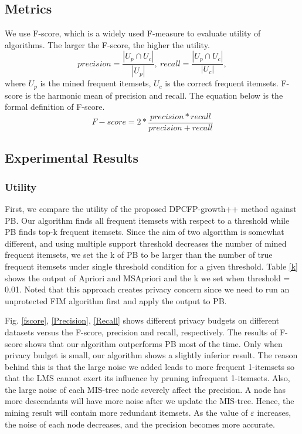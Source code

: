\documentclass[conference]{IEEEtran}
\begin{document}
\subsection{Metrics}
We use F-score, which is a widely used F-measure to evaluate utility of algorithms. 
The larger the F-score, the higher the utility. 
\begin{equation*}
    precision = \frac{|U_p\cap U_c|}{|U_p|}, \ recall = \frac{|U_p\cap U_c|}{|U_c|},
\end{equation*}
where $U_p$ is the mined frequent itemsets, $U_c$ is the correct frequent itemsets. 
F-score is the harmonic mean of precision and recall. 
The equation below is the formal definition of F-score. 
\begin{equation*}    
    F-score = 2*\frac{precision*recall}{precision+recall}
\end{equation*}

\subsection{Experimental Results}
\subsubsection{Utility} 
First, we compare the utility of the proposed DPCFP-growth++ method against PB. 
Our algorithm finds all frequent itemsets with respect to a threshold while PB finds top-k frequent itemsets. 
Since the aim of two algorithm is somewhat different, and using multiple support threshold decreases the number of mined frequent itemsets, 
we set the k of PB to be larger than the number of true frequent itemsets under single threshold condition for a given threshold. 
Table \ref{k} shows the output of Apriori and MSApriori and the k we set when threshold = 0.01. 
Noted that this approach creates privacy concern since we need to run an unprotected FIM algorithm first and apply the output to PB.

Fig. \ref{fscore}, \ref{Precision}, \ref{Recall} shows different privacy budgets on different datasets versus the F-score, precision and recall, respectively. 
The results of F-score shows that our algorithm outperforms PB most of the time. 
Only when privacy budget is small, our algorithm shows a slightly inferior result. 
The reason behind this is that the large noise we added leads to more frequent 1-itemsets so that the LMS cannot exert its influence by pruning infrequent 1-itemsets.
Also, the large noise of each MIS-tree node severely affect the precision. 
A node has more descendants will have more noise after we update the MIS-tree.  
Hence, the mining result will contain more redundant itemsets. 
As the value of $\varepsilon$ increases, the noise of each node decreases, and the precision becomes more accurate. 
 
\end{document}
